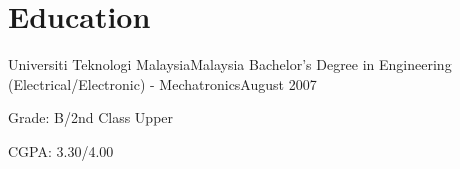 \section{\textbf{Education}}
\vspace{-0.4mm}
\resumeSubHeadingListStart

\resumeSubheading
{Universiti Teknologi Malaysia}{Malaysia}
{Bachelor's Degree in Engineering (Electrical/Electronic) - Mechatronics}{August 2007}
\resumeItemListStart
\item Grade: B/2nd Class Upper
\item CGPA: 3.30/4.00
\resumeItemListEnd


\resumeSubHeadingListEnd
